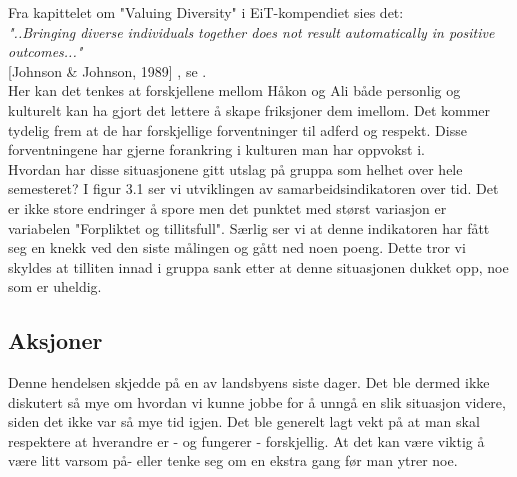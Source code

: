 Fra kapittelet om "Valuing Diversity" i EiT-kompendiet sies det:\\

\textit{"..Bringing diverse individuals together does not result automatically in positive outcomes..."}\\{[Johnson & Johnson, 1989]}
, se \cite{EiTkomp}.\\

Her kan det tenkes at forskjellene mellom Håkon og Ali både personlig og kulturelt kan ha gjort det lettere å skape friksjoner dem imellom. Det kommer tydelig frem at de har forskjellige forventninger til adferd og respekt. Disse forventningene har gjerne forankring i kulturen man har oppvokst i.\\
 
Hvordan har disse situasjonene gitt utslag på gruppa som helhet over hele semesteret? I figur 3.1 ser vi utviklingen av samarbeidsindikatoren over tid. Det er ikke store endringer å spore men det punktet med størst variasjon er variabelen "Forpliktet og tillitsfull". Særlig ser vi at denne indikatoren har fått seg en knekk ved den siste målingen og gått ned noen poeng. Dette tror vi skyldes at tilliten innad i gruppa sank etter at denne situasjonen dukket opp, noe som er uheldig.


\newpage

\subsection{Aksjoner}


Denne hendelsen skjedde på en av landsbyens siste dager. Det ble dermed ikke diskutert så mye om hvordan vi kunne jobbe for å unngå en slik situasjon videre, siden det ikke var så mye tid igjen. Det ble generelt lagt vekt på at man skal respektere at hverandre er - og fungerer - forskjellig. At det kan være viktig å være litt varsom på- eller tenke seg om en ekstra gang før man ytrer noe.\\\\

